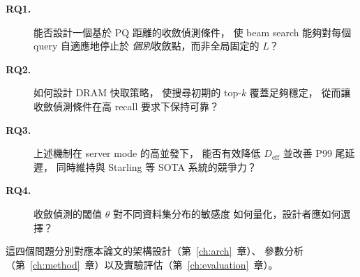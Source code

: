 \begin{description}
  \item[\textbf{RQ1.}] 能否設計一個基於 PQ 距離的收斂偵測條件，
    使 beam search 能夠對每個 query 自適應地停止於
    \emph{個別}收斂點，而非全局固定的 $L$？

  \item[\textbf{RQ2.}] 如何設計 DRAM 快取策略，
    使搜尋初期的 top-$k$ 覆蓋足夠穩定，
    從而讓收斂偵測條件在高 recall 要求下保持可靠？

  \item[\textbf{RQ3.}] 上述機制在 server mode 的高並發下，
    能否有效降低 $D_\text{eff}$ 並改善 P99 尾延遲，
    同時維持與 Starling 等 SOTA 系統的競爭力？

  \item[\textbf{RQ4.}] 收斂偵測的閾值 $\theta$ 對不同資料集分布的敏感度
    如何量化，設計者應如何選擇？
\end{description}

這四個問題分別對應本論文的架構設計（第~\ref{ch:arch}~章）、
參數分析（第~\ref{ch:method}~章）以及實驗評估（第~\ref{ch:evaluation}~章）。
